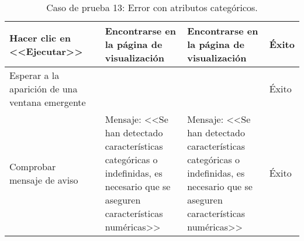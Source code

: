 \begin{table}[H]
\begin{tabular}{p{}p{}p{}p{}p{}}
Hacer clic en <<Ejecutar>>                            &                        & Encontrarse en la página de visualización                            & Encontrarse en la página de visualización                    & Éxito                            \\ \hline
Esperar a la aparición de una ventana emergente       &                   & & & Éxito  \\ \hline 
Comprobar mensaje de aviso                            &                        & Mensaje: <<Se han detectado características categóricas o indefinidas, es necesario que se aseguren características numéricas>> & Mensaje: <<Se han detectado características categóricas o indefinidas, es necesario que se aseguren características numéricas>> & Éxito \\ \hline
\end{tabular}
\caption{Caso de prueba 13: Error con atributos categóricos.}
\end{table}

